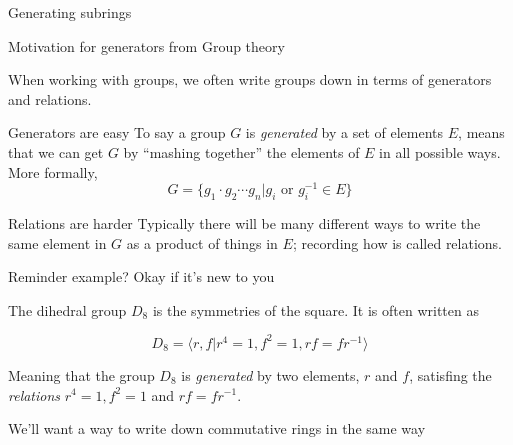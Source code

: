 \documentclass{beamer}
\begin{document}
\begin{frame}[plain,c]

\begin{center}

\Huge

Generating subrings
\end{center}

\end{frame}


\begin{frame}{Motivation for generators from Group theory}

When working with groups, we often write groups down in terms of generators and relations.

\begin{block}{Generators are easy}
To say a group $G$ is \emph{generated} by a set of elements $E$, means that we can get $G$ by ``mashing together'' the elements of $E$ in all possible ways. More formally, 
$$G=\{g_1\cdot g_2\cdots g_n | g_i \text{ or } g_i^{-1}\in E\}$$
\end{block}


\begin{block}{Relations are harder}
Typically there will be many different ways to write the same element in $G$ as a product of things in $E$; recording how is called relations.
\end{block}
\end{frame}

\begin{frame}{Reminder example?  Okay if it's new to you }
\begin{example}
The dihedral group $D_{8}$ is the symmetries of the square.  It is often written as

$$D_8=\langle r,f | r^4=1, f^2=1, rf=fr^{-1}\rangle $$

Meaning that the group $D_8$ is \emph{generated} by two elements, $r$ and $f$, satisfing the \emph{relations} $r^4=1, f^2=1$ and $rf=fr^{-1}$.
\end{example}

\begin{block}{We'll want a way to write down commutative rings in the same way}
\end{block}


\end{frame}
\end{document}
